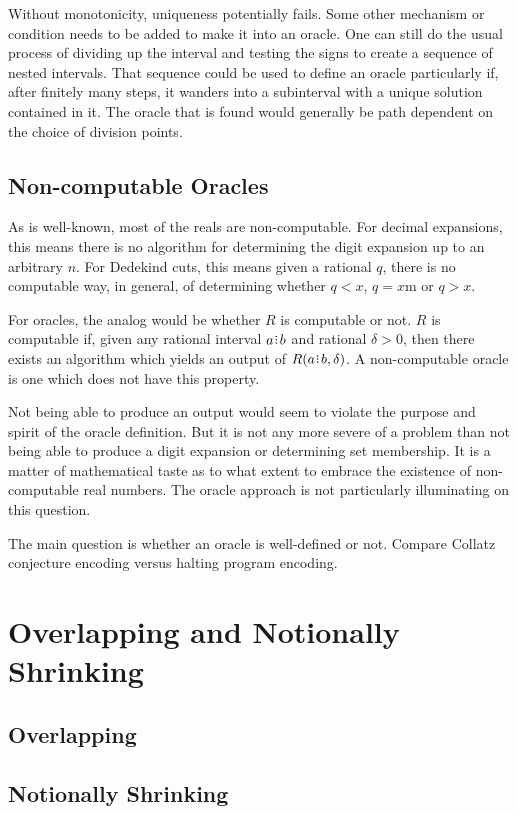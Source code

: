 \documentclass[12pt]{article}
\begin{document}
Without monotonicity, uniqueness potentially fails. Some other mechanism or condition needs to be added to make it into an oracle. One can still do the usual process of dividing up the interval and testing the signs to create a sequence of nested intervals. That sequence could be used to define an oracle particularly if, after finitely many steps, it wanders into a subinterval with a unique solution contained in it. The oracle that is found would generally be path dependent on the choice of division points. 

\subsection{Non-computable Oracles}

As is well-known, most of the reals are non-computable. For decimal expansions, this means there is no algorithm for determining the digit expansion up to an arbitrary $n$. For Dedekind cuts, this means given a rational $q$, there is no computable way, in general, of determining whether $q < x$, $q = x$m or $q > x$. 

For oracles, the analog would be whether $R$ is computable or not. $R$ is computable if, given any rational interval $a\rint b$ and rational $\delta > 0$, then there exists an algorithm which yields an output of $R(a\rint b, \delta)$. A non-computable oracle is one which does not have this property. 

Not being able to produce an output would seem to violate the purpose and spirit of the oracle definition. But it is not any more severe of a problem than not being able to produce a digit expansion or determining set membership. It is a matter of mathematical taste as to what extent to embrace the existence of non-computable real numbers. The oracle approach is not particularly illuminating on this question. 

The main question is whether an oracle is well-defined or not. Compare Collatz conjecture encoding versus halting program encoding. 


\section{Overlapping and Notionally Shrinking}

\subsection{Overlapping}

\subsection{Notionally Shrinking}
\end{document}

